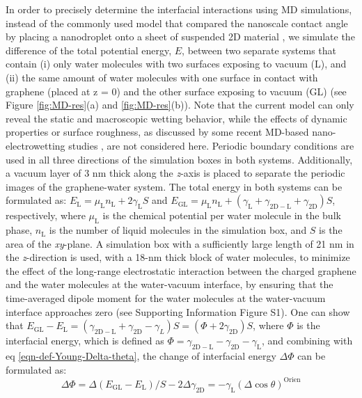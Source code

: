 In order to precisely determine the interfacial interactions using MD
simulations, instead of the commonly used model that compared the
nanoscale contact angle by placing a nanodroplet onto a sheet of
suspended 2D material
\cite{ostrowski_tunable_2014,daub_electrowetting_2007,ren_interfacial_2015,Taherian_2015},
we simulate the difference of the total potential energy, \(E\),
between two separate systems that contain (i) only water molecules
with two surfaces exposing to vacuum (L), and (ii) the same amount of
water molecules with one surface in contact with graphene (placed at z
= 0) and the other surface exposing to vacuum (GL) (see Figure
\ref{fig:MD-res}(a) and \ref{fig:MD-res}(b)). Note that the current
model can only reveal the static and macroscopic wetting behavior,
while the effects of dynamic properties or surface roughness, as
discussed by some recent MD-based nano-electrowetting studies
\cite{Yuan_2010_PF,Zhao_2015_pillar}, are not considered here.
Periodic boundary conditions are used in all three directions of the
simulation boxes in both systems. Additionally, a vacuum layer of 3 nm
thick along the \emph{z}-axis is placed to separate the periodic
images of the graphene-water system. The total energy in both systems
can be formulated as:
\(E_{\mathrm{L}} = \mu_{\mathrm{L}}n_{\mathrm{L}} +
2\gamma_{\mathrm{L}}S\) and
\(E_{\mathrm{GL}}=\mu_{\mathrm{L}}n_{\mathrm{L}}+(\gamma_{\mathrm{L}}
+ \gamma_{\mathrm{2D-L}} + \gamma_{\mathrm{2D}})S\), respectively,
where \(\mu_{\mathrm{L}}\) is the chemical potential per water
molecule in the bulk phase, \(n_{\mathrm{L}}\) is the number of liquid
molecules in the simulation box, and \(S\) is the area of the
\emph{xy}-plane.  A simulation box with a sufficiently large length of
21 nm in the \emph{z}-direction is used, with a 18-nm thick block of
water molecules, to minimize the effect of the long-range
electrostatic interaction between the charged graphene and the water
molecules at the water-vacuum interface, by ensuring that the
time-averaged dipole moment for the water molecules at the
water-vacuum interface approaches zero (see Supporting Information
Figure S1).  One can show that
\(E_{\mathrm{GL}} - E_{\mathrm{L}} = (\gamma_{\mathrm{2D-L}} +
\gamma_{\mathrm{2D}} - \gamma_{L})S = (\Phi + 2
\gamma_{\mathrm{2D}})S\), where \(\Phi\) is the interfacial energy,
which is defined as
\(\Phi = \gamma_{\mathrm{2D-L}} - \gamma_{\mathrm{2D}} -
\gamma_{\mathrm{L}}\), and combining with eq
\ref{eqn-def-Young-Delta-theta}, the change of interfacial energy
\(\Delta \Phi\) can be formulated as:
\begin{equation}
\label{eqn-Delta-Phi-Delta-cos}
\Delta \Phi = \Delta (E_{\mathrm{GL}} - E_{\mathrm{L}})/S - 2\Delta \gamma_{\mathrm{2D}} = -\gamma_{\mathrm{L}} (\Delta \cos \theta)^{\mathrm{Orien}}
\end{equation}
